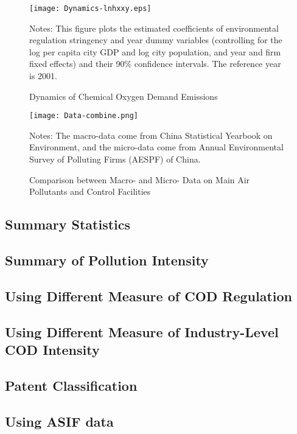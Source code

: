 \documentclass[12pt,english]{article}
\newcommand\fnote[1]{\captionsetup{justification=justified, textfont=footnotesize}\caption*{#1}}
\begin{document}
\begin{figure}[htbp]
	\caption{Dynamics of Chemical Oxygen Demand Emissions}
	\label{fig:dynamicscod}
	\centering
	\texttt{[image: Dynamics-lnhxxy.eps]}
	\fnote{Notes: This figure plots the estimated coefficients of environmental regulation stringency and year dummy variables (controlling for the log per capita city GDP and log city population, and year and firm fixed effects) and their 90\% confidence intervals. The reference year is 2001.}
\end{figure}

\clearpage
\newpage

\begin{figure}[htbp]
	\caption{Comparison between Macro- and Micro- Data on Main Air Pollutants and Control Facilities}
	\label{fig:Data-combine.png}
	\centering
	\texttt{[image: Data-combine.png]}
	\fnote{Notes: The macro-data come from China Statistical Yearbook on Environment, and the micro-data come from Annual Environmental Survey of Polluting Firms (AESPF) of China.}
\end{figure}

\clearpage
\newpage

\subsection{Summary Statistics}


\clearpage
\newpage

\subsection{Summary of Pollution Intensity}


\clearpage
\newpage

\subsection{Using Different Measure of COD Regulation}


\clearpage
\newpage

\subsection{Using Different Measure of Industry-Level COD Intensity}

\clearpage
\newpage

\subsection{Patent Classification}



\clearpage
\newpage


\subsection{Using ASIF data}


\clearpage
\newpage
\end{document}

